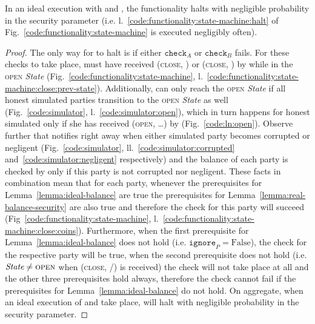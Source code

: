 \begin{lemma}[No halt]
\label{lemma:no-halt}
  In an ideal execution with \fchan and \simulator, the functionality halts with
  negligible probability in the security parameter (i.e.
  l.~\ref{code:functionality:state-machine:halt} of
  Fig.~\ref{code:functionality:state-machine} is executed negligibly often).
\end{lemma}

\begin{proof}
  The only way for \fchan to halt is if either $\texttt{check}_A$ or
  $\texttt{check}_B$ fails. For these checks to take place, \fchan must have
  received (\textsc{close}, \alice) or (\textsc{close}, \bob) by \simulator
  while in the \textsc{open} \textit{State}
  (Fig.~\ref{code:functionality:state-machine},
  l.~\ref{code:functionality:state-machine:close:prev-state}). Additionally,
  \fchan can only reach the \textsc{open} \textit{State} if all honest simulated
  parties transition to the \textsc{open} \textit{State} as well
  (Fig.~\ref{code:simulator}, l.~\ref{code:simulator:open}), which in turn
  happens for honest simulated \alice only if she has received (\textsc{open},
  \dots) by \environment (Fig.~\ref{code:ln:open}). Observe further that
  \simulator notifies \fchan right away when either simulated party becomes
  corrupted or negligent (Fig.~\ref{code:simulator},
  ll.~\ref{code:simulator:corrupted} and~\ref{code:simulator:negligent}
  respectively) and the balance of each party is checked by \fchan only if this
  party is not corrupted nor negligent. These facts in combination mean that for
  each party, whenever the prerequisites for Lemma~\ref{lemma:ideal-balance} are
  true the prerequisites for Lemma~\ref{lemma:real-balance-security} are also
  true and therefore the check for this party will succeed
  (Fig~\ref{code:functionality:state-machine},
  l.~\ref{code:functionality:state-machine:close:coins}). Furthermore, when the
  first prerequisite for Lemma~\ref{lemma:ideal-balance} does not hold (i.e.
  $\texttt{ignore}_P = \mathrm{False}$), the check for the respective party will
  be true, when the second prerequisite does not hold (i.e. $\textit{State} \neq
  \textsc{open}$ when (\textsc{close}, \alice/\bob) is received) the check will
  not take place at all and the other three prerequisites hold always, therefore
  the check cannot fail if the prerequisites for Lemma~\ref{lemma:ideal-balance}
  do not hold. On aggregate, when an ideal execution of \fchan and \simulator
  take place, \fchan will halt with negligible probability in the security
  parameter.
\end{proof}
